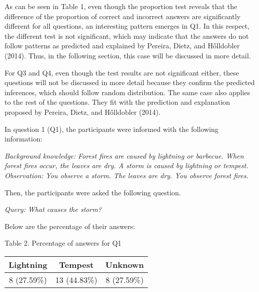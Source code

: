 \documentclass[]{interact}
\theoremstyle{plain}%
\theoremstyle{definition}
\theoremstyle{remark}
\begin{document}
As can be seen in Table 1, even though the proportion test reveals that the difference of the proportion of correct and incorrect answers are significantly different for all questions, an interesting pattern emerges in Q1. In this respect, the different test is not significant, which may indicate  that the answers do not follow patterns as predicted and explained by Pereira, Dietz, and Hőlldobler (2014). Thus, in the following section, this case will be discussed in more detail.  

For Q3 and Q4, even though the test results are not significant either, these questions will not be discussed in more detail because they confirm the predicted inferences, which should follow random distribution. The same case also applies to the rest of the questions. They fit with the prediction and explanation proposed by Pereira, Dietz, and Hőlldobler (2014).

In question 1 (Q1), the participants were informed with the following information:

\hfill\begin{minipage}{\dimexpr\textwidth-1cm}
    \emph{Background knowledge:} 
    \newline
    \emph{Forest fires are caused by lightning or barbecue. \newline When forest fires occur, the leaves are dry. \newline A storm is caused by lightning or tempest.}
    \newline
    \newline
    \emph{Observation:}
    \newline
    \emph{You observe a storm. \newline The leaves are dry. \newline You observe forest fires.}
\end{minipage}

Then, the participants were asked the following question.

\hfill\begin{minipage}{\dimexpr\textwidth-1cm}
    \emph{Query:}
    \newline
    \emph{What causes the storm?}
\end{minipage}

Below are the percentage of their answers:

\begin{center}
Table 2. Percentage of answers for Q1
\linebreak
\begin{tabular}{ |c|c|c| } 
 \hline
 Lightning & Tempest & Unknown \\
 \hline
 8 (27.59\%) & 13 (44.83\%) & 8 (27.59\%) \\
 \hline
\end{tabular}
\end{center}
\end{document}
